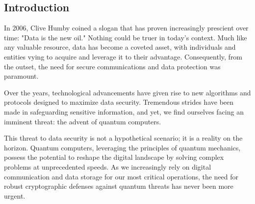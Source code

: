 \begin{center}
\section*{Introduction}
\end{center}

In 2006, Clive Humby coined a slogan that has proven increasingly prescient over time: "Data is the new oil." Nothing could be truer in today's context. Much like any valuable resource, data has become a coveted asset, with individuals and entities vying to acquire and leverage it to their advantage. Consequently, from the outset, the need for secure communications and data protection was paramount.

Over the years, technological advancements have given rise to new algorithms and protocols designed to maximize data security. Tremendous strides have been made in safeguarding sensitive information, and yet, we find ourselves facing an imminent threat: the advent of quantum computers.

This threat to data security is not a hypothetical scenario; it is a reality on the horizon. Quantum computers, leveraging the principles of quantum mechanics, possess the potential to reshape the digital landscape by solving complex problems at unprecedented speeds. As we increasingly rely on digital communication and data storage for our most critical operations, the need for robust cryptographic defenses against quantum threats has never been more urgent.